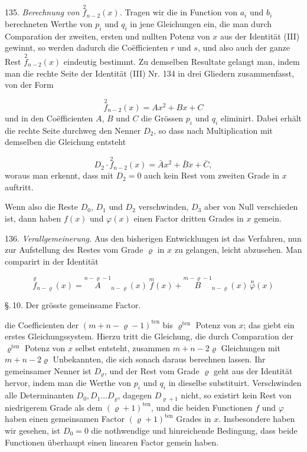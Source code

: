 \documentclass[11pt]{article}
\providecommand{\weberpage}[1]{}
\begin{document}
135. \textit{Berechnung von $\overset{2}{f}_{n-2}(x)$.} Tragen wir die in Function von $a_i$ und $b_i$ berechneten Werthe von $p_i$ und $q_i$ in jene Gleichungen ein, die man durch Comparation der zweiten, ersten und nullten Potenz von $x$ aus der Identität (III) gewinnt, so werden dadurch die Co\"efficienten $r$ und $s$, und also auch der ganze Rest $\overset{2}{f}_{n-2}(x)$ eindeutig bestimmt. Zu demselben Resultate gelangt man, indem man die rechte Seite der Identität (III) Nr. 134 in drei Gliedern zusammenfasst, von der Form

\[
\overset{2}{f}_{n-2}(x) = Ax^2 + Bx + C
\]
und in den Co\"efficienten $A$, $B$ und $C$ die Grössen $p_i$ und $q_i$ eliminirt. Dabei erhält die rechte Seite durchweg den Nenner $D_2$, so dass nach Multiplication mit demselben die Gleichung entsteht

\[
D_2 \cdot \overset{2}{f}_{n-2}(x) = \bar A x^2 + \bar B x + \bar C,
\]
woraus man erkennt, dass mit $D_2 = 0$ auch kein Rest vom zweiten Grade in $x$ auftritt.

Wenn also die Reste $D_0$, $D_1$ und $D_2$ verschwinden, $D_3$ aber von Null verschieden ist, dann haben $f(x)$ und $\varphi(x)$ einen Factor dritten Grades in $x$ gemein.

136. \textit{Verallgemeinerung.} Aus den bisherigen Entwicklungen ist das Verfahren, nun zur Aufstellung des Restes vom Grade $\varrho$ in $x$ zu gelangen, leicht abzusehen. Man comparirt in der Identität

\[
\overset{\varrho}{f}_{n-\varrho}(x) = \overset{n-\varrho-1}{A}_{n-\varrho}(x)\,\overset{m}{f}(x) + \overset{m-\varrho-1}{B}_{n-\varrho}(x)\,\overset{n}{\varphi}(x)
\]


\weberpage{143}

\begin{center}
\S.\,10. Der grösste gemeinsame Factor.
\end{center}

die Coefficienten der $(m+n-\varrho-1)^{\mathrm{ten}}$ bis $\varrho^{\mathrm{ten}}$ Potenz von $x$; das giebt ein erstes Gleichungssystem. Hierzu tritt die Gleichung, die durch Comparation der $\varrho^{\mathrm{ten}}$ Potenz von $x$ selbst entsteht, zusammen $m+n-2\varrho$ Gleichungen mit $m+n-2\varrho$ Unbekannten, die sich sonach daraus berechnen lassen. Ihr gemeinsamer Nenner ist $D_\varrho$, und der Rest vom Grade $\varrho$ geht aus der Identität hervor, indem man die Werthe von $p_i$ und $q_i$ in dieselbe substituirt. Verschwinden alle Determinanten $D_0, D_1 \ldots D_\varrho$, dagegen $D_{\varrho+1}$ nicht, so existirt kein Rest von niedrigerem Grade als dem $(\varrho+1)^{\mathrm{ten}}$, und die beiden Functionen $f$ und $\varphi$ haben einen gemeinsamen Factor $(\varrho+1)^{\mathrm{ten}}$ Grades in $x$. Insbesondere haben wir gesehen, ist $D_0 = 0$ die nothwendige und hinreichende Bedingung, dass beide Functionen überhaupt einen linearen Factor gemein haben.
\end{document}
